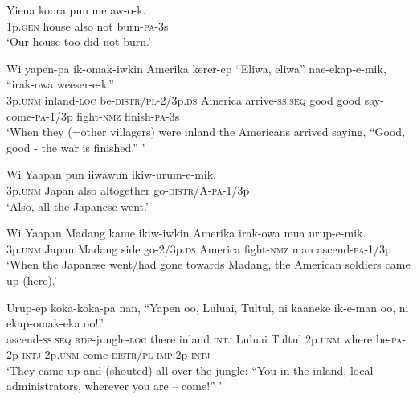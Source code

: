 {\ea\label{ex:a:x93}
\gll  Yiena  koora  pun  me  aw-o-k. \\
1p.\textsc{gen}  house  also  not  burn-\textsc{pa}-3s \\
\glt ‘Our house too did not burn.’ \\
\z


\ea\label{ex:a:x94}
\gll  Wi  yapen-pa  ik-omak-iwkin  Amerika  kerer-ep             “Eliwa,  eliwa”  nae-ekap-e-mik,  “irak-owa  weeser-e-k.” \\
3p.\textsc{unm}  inland-\textsc{loc}  be-\textsc{distr}/\textsc{pl}-2/3p.\textsc{ds}  America  arrive-\textsc{ss.seq}  good  good  say-come-\textsc{pa}-1/3p  fight-\textsc{nmz}  finish-\textsc{pa}-3s \\
\glt ‘When they (=other villagers) were inland the Americans arrived saying, “Good, good - the war is finished.” ’ \\
\z


\ea\label{ex:a:x95}
\gll  Wi  Yaapan  pun  iiwawun  ikiw-urum-e-mik. \\
3p.\textsc{unm}  Japan  also  altogether  go-\textsc{distr}/A-\textsc{pa}-1/3p \\
\glt ‘Also, all the Japanese went.’ \\
\z


\ea\label{ex:a:x96}
\gll  Wi  Yaapan  Madang  kame  ikiw-iwkin  Amerika  irak-owa mua  urup-e-mik. \\
3p.\textsc{unm}  Japan  Madang  side  go-2/3p.\textsc{ds}  America  fight-\textsc{nmz}   man  ascend-\textsc{pa}-1/3p \\


\glt ‘When the Japanese went/had gone towards Madang, the American soldiers came up (here).’ \\
\z


\ea\label{ex:a:x97}
\gll  Urup-ep  koka-koka-pa  nan,  “Yapen  oo,  Luluai,  Tultul,   ni  kaaneke  ik-e-man  oo,  ni  ekap-omak-eka               oo!” \\
ascend-\textsc{ss.seq}  \textsc{rdp}-jungle-\textsc{loc}  there  inland  \textsc{intj}  Luluai  Tultul 2p.\textsc{unm}  where  be-\textsc{pa}-2p  \textsc{intj}  2p.\textsc{unm}  come-\textsc{distr}/\textsc{pl}-\textsc{imp}.2p \textsc{intj} \\




\glt ‘They came up and (shouted) all over the jungle: “You in the inland, local administrators, wherever you are – come!” ’ \\
\z


}
